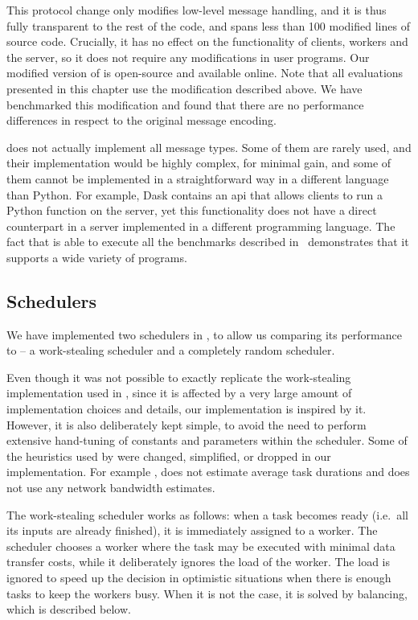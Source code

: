 This protocol change only modifies low-level message handling, and it is thus fully transparent to
the rest of the code, and spans less than 100 modified lines of \dask{} source
code. Crucially, it has no effect on the functionality of clients, workers and the server, so it
does not require any modifications in \dask{} user programs. Our modified
version of \dask{} is open-source and available
online. Note that all evaluations presented in this chapter use the
modification described above. We have benchmarked this modification and found that there are no
performance differences in respect to the original \dask{} message encoding.

\rsds{} does not actually implement all \dask{} message
types. Some of them are rarely used, and their implementation would be highly complex, for minimal
gain, and some of them cannot be implemented in a straightforward way in a different language than
Python. For example, Dask contains an \gls{api} that allows clients to run a
Python function on the server, yet this functionality does not have a direct counterpart in a
server implemented in a different programming language. The fact that \rsds{}
is able to execute all the benchmarks described in~ demonstrates that it
supports a wide variety of \dask{} programs.

\subsection*{Schedulers}
We have implemented two schedulers in \rsds{}, to allow us comparing its
performance to \dask{} -- a work-stealing scheduler and a completely random
scheduler.

Even though it was not possible to exactly replicate the work-stealing implementation used in
\dask{}, since it is affected by a very large amount of implementation choices
and details, our implementation is inspired by it. However, it is also deliberately kept simple, to
avoid the need to perform extensive hand-tuning of constants and parameters within the scheduler.
Some of the heuristics used by \dask{} were changed, simplified, or dropped in
our implementation. For example \rsds{}, does not estimate average task
durations and does not use any network bandwidth estimates.

The \rsds{} work-stealing scheduler works as follows: when a task becomes ready
(i.e.\ all its inputs are already finished), it is immediately assigned to a worker. The scheduler
chooses a worker where the task may be executed with minimal data transfer costs, while it
deliberately ignores the load of the worker. The load is ignored to speed up the decision in
optimistic situations when there is enough tasks to keep the workers busy. When it is not the case,
it is solved by balancing, which is described below.

